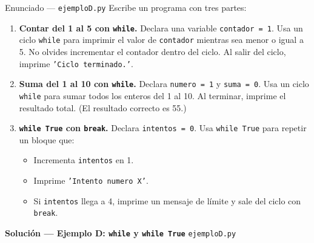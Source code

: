 \documentclass[12pt,a4paper]{article}
\begin{document}
\vspace{0.8em}
\begin{enunciadobox}{Enunciado — \texttt{ejemploD.py}}
Escribe un programa con tres partes:

\begin{enumerate}
  \item \textbf{Contar del 1 al 5 con \texttt{while}.}
        Declara una variable \texttt{contador = 1}.
        Usa un ciclo \texttt{while} para imprimir el valor de \texttt{contador}
        mientras sea menor o igual a 5.
        No olvides incrementar el contador dentro del ciclo.
        Al salir del ciclo, imprime \texttt{'Ciclo terminado.'}.

  \item \textbf{Suma del 1 al 10 con \texttt{while}.}
        Declara \texttt{numero = 1} y \texttt{suma = 0}.
        Usa un ciclo \texttt{while} para sumar todos los enteros del 1 al 10.
        Al terminar, imprime el resultado total.
        (El resultado correcto es 55.)

  \item \textbf{\texttt{while True} con \texttt{break}.}
        Declara \texttt{intentos = 0}.
        Usa \texttt{while True} para repetir un bloque que:
        \begin{itemize}
          \item Incrementa \texttt{intentos} en 1.
          \item Imprime \texttt{'Intento numero X'}.
          \item Si \texttt{intentos} llega a 4, imprime un mensaje de límite
                y sale del ciclo con \texttt{break}.
        \end{itemize}
\end{enumerate}
\end{enunciadobox}

\newpage
\begin{solucionbanner}
  {\large\bfseries\color{solColor} Solución — Ejemplo D: \texttt{while} y \texttt{while True}}
  \hfill \texttt{ejemploD.py}
\end{solucionbanner}

\vspace{0.8em}


\vspace{0.8em}
\end{document}
